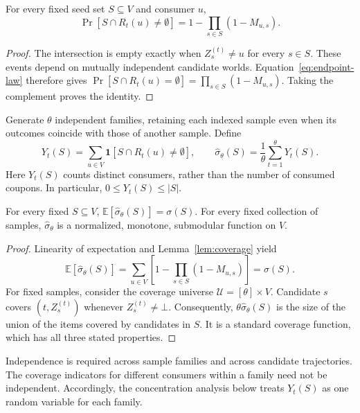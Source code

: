 \documentclass[sigconf]{acmart}
\begin{document}
\begin{lemma}
\label{lem:coverage}
For every fixed seed set $S\subseteq V$ and consumer $u$,
\begin{equation}
\label{eq:reverse-coverage}
 \Pr[S\cap R_t(u)\ne\emptyset]
 =1-\prod_{s\in S}(1-M_{u,s}).
\end{equation}
\end{lemma}
\begin{proof}
The intersection is empty exactly when $Z_s^{(t)}\ne u$ for
every $s\in S$. These events depend on mutually independent
candidate worlds. Equation~\eqref{eq:endpoint-law} therefore gives
$\Pr[S\cap R_t(u)=\emptyset]=\prod_{s\in S}(1-M_{u,s})$.
Taking the complement proves the identity.
\end{proof}

Generate $\theta$ independent families, retaining each indexed
sample even when its outcomes coincide with those of another sample.
Define
\begin{equation}
\label{eq:empirical-spread}
 Y_t(S)=\sum_{u\in V}\mathbf1[S\cap R_t(u)\ne\emptyset],
 \qquad
 \hat\sigma_\theta(S)=\frac1\theta\sum_{t=1}^\theta Y_t(S).
\end{equation}
Here $Y_t(S)$ counts distinct consumers, rather than the number
of consumed coupons. In particular, $0\le Y_t(S)\le |S|$.

\begin{lemma}
\label{lem:unbiased}
For every fixed $S\subseteq V$,
$\mathbb E[\hat\sigma_\theta(S)]=\sigma(S)$.
For every fixed collection of samples, $\hat\sigma_\theta$ is a
normalized, monotone, submodular function on $V$.
\end{lemma}
\begin{proof}
Linearity of expectation and Lemma~\ref{lem:coverage} yield
\[
 \mathbb E[\hat\sigma_\theta(S)]
 =\sum_{u\in V}\left[1-\prod_{s\in S}(1-M_{u,s})\right]
 =\sigma(S).
\]
For fixed samples, consider the coverage universe
$\mathcal U=[\theta]\times V$. Candidate $s$ covers
$(t,Z_s^{(t)})$ whenever $Z_s^{(t)}\ne\bot$.
Consequently, $\theta\hat\sigma_\theta(S)$ is the size of the
union of the items covered by candidates in $S$.
It is a standard coverage function, which has all three stated
properties.
\end{proof}

Independence is required across sample families and across
candidate trajectories. The coverage indicators for different
consumers within a family need not be independent. Accordingly,
the concentration analysis below treats $Y_t(S)$ as one random
variable for each family.
\end{document}
